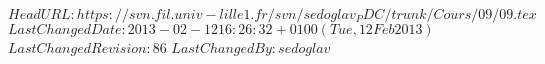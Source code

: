 \svnidlong 
{$HeadURL: https://svn.fil.univ-lille1.fr/svn/sedoglav_PDC/trunk/Cours/09/09.tex $} 
{$LastChangedDate: 2013-02-12 16:26:32 +0100 (Tue, 12 Feb 2013) $} 
{$LastChangedRevision: 86 $} 
{$LastChangedBy: sedoglav $} 
